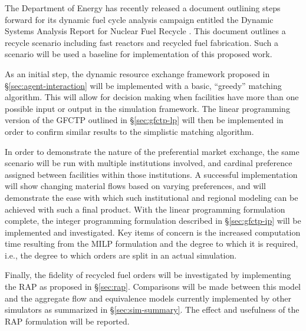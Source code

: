 The Department of Energy has recently released a document outlining steps forward
for its dynamic fuel cycle analysis campaign entitled the Dynamic Systems
Analysis Report for Nuclear Fuel Recycle \cite{dixon_dynamic_2008}. This
document outlines a recycle scenario including fast reactors and recycled fuel
fabrication. Such a scenario will be used a baseline for implementation of this
proposed work.

As an initial step, the dynamic resource exchange framework proposed in
\S\ref{sec:agent-interaction} will be implemented with a basic, ``greedy''
matching algorithm. This will allow for decision making when facilities have
more than one possible input or output in the \Cyclus simulation framework. The
linear programming version of the GFCTP outlined in \S\ref{sec:gfctp-lp} will
then be implemented in order to confirm similar results to the simplistic
matching algorithm. 

In order to demonstrate the nature of the preferential market exchange, the same
scenario will be run with multiple institutions involved, and cardinal
preference assigned between facilities within those institutions. A successful
implementation will show changing material flows based on varying preferences,
and will demonstrate the ease with which such institutional and regional
modeling can be achieved with such a final product. With the linear programming
formulation complete, the integer programming formulation described in
\S\ref{sec:gfctp-ip} will be implemented and investigated. Key items of concern
is the increased computation time resulting from the MILP formulation and the
degree to which it is required, i.e., the degree to which orders are split in an
actual simulation. 

Finally, the fidelity of recycled fuel orders will be investigated by
implementing the RAP as proposed in \S\ref{sec:rap}. Comparisons will be made
between this model and the aggregate flow and equivalence models currently
implemented by other simulators as summarized in \S\ref{sec:sim-summary}. The
effect and usefulness of the RAP formulation will be reported.
